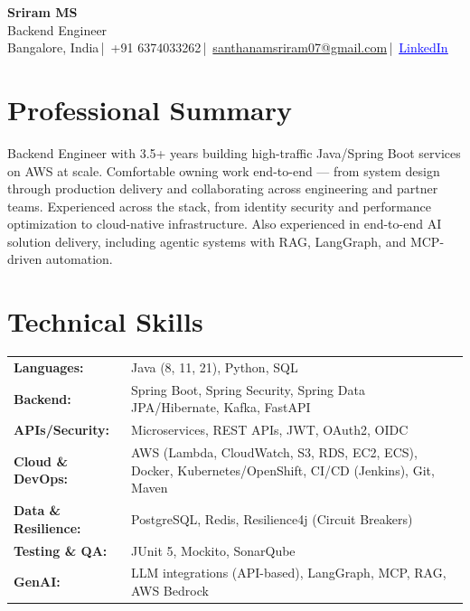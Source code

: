 \documentclass[10pt]{article}
\begin{document}
\pagestyle{empty}

\begin{center}
      {\LARGE\bfseries Sriram MS} \\[2pt]
      Backend Engineer \\[2pt]
      Bangalore, India\,|\,
      +91 6374033262\,|\,
      \href{mailto:santhanamsriram07@gmail.com}{santhanamsriram07@gmail.com}\,|\,
      \href{https://www.linkedin.com/in/sriram-ms}{\textcolor{blue}{\underline{LinkedIn}}}
\end{center}

\section{Professional Summary}
Backend Engineer with 3.5+ years building high-traffic Java/Spring Boot services on AWS at scale.
Comfortable owning work end-to-end --- from system design through production delivery and
collaborating across engineering and partner teams. Experienced across the stack, from identity
security and performance optimization to cloud-native infrastructure. Also experienced in
end-to-end AI solution delivery, including agentic systems with RAG, LangGraph, and MCP-driven
automation.

\section{Technical Skills}
\begin{tabular}{@{} l l}
  \textbf{Languages:}       & Java (8, 11, 21), Python, SQL \\
  \textbf{Backend:}         & Spring Boot, Spring Security, Spring Data JPA/Hibernate, Kafka, FastAPI \\
  \textbf{APIs/Security:}   & Microservices, REST APIs, JWT, OAuth2, OIDC \\
  \textbf{Cloud \& DevOps:} & AWS (Lambda, CloudWatch, S3, RDS, EC2, ECS), Docker, Kubernetes/OpenShift, CI/CD (Jenkins), Git, Maven \\
  \textbf{Data \& Resilience:} & PostgreSQL, Redis, Resilience4j (Circuit Breakers) \\
  \textbf{Testing \& QA:}   & JUnit 5, Mockito, SonarQube \\
  \textbf{GenAI:}           & LLM integrations (API-based), LangGraph, MCP, RAG, AWS Bedrock \\
\end{tabular}
\end{document}
